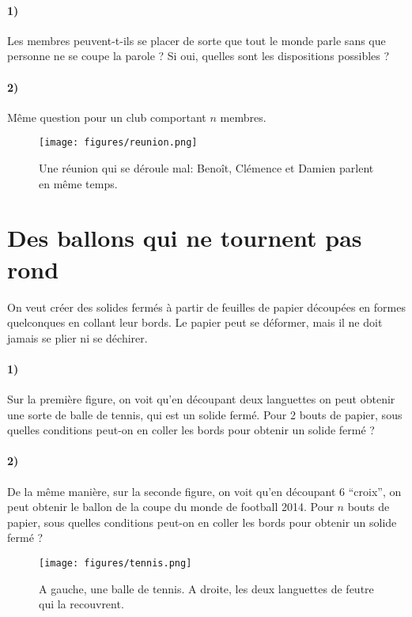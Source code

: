 \documentclass[a4paper,10pt,oneside]{article}
\begin{document}
\paragraph*{1)}
Les membres peuvent-t-ils se placer de sorte que tout le monde parle sans que personne ne se coupe la parole ?
Si oui, quelles sont les dispositions possibles ?

\paragraph*{2)}
Même question pour un club comportant $n$ membres.

\vspace{3cm}
\begin{figure}[!ht]
  \centering
  \texttt{[image: figures/reunion.png]}
  \caption*{Une réunion qui se déroule mal: Benoît, Clémence et Damien parlent en même temps. }
\end{figure}


\clearpage
\section{Des ballons qui ne tournent pas rond}

On veut créer des solides fermés à partir de feuilles de papier découpées en formes quelconques en collant leur bords.
Le papier peut se déformer, mais il ne doit jamais se plier ni se déchirer.

\paragraph*{1)}
Sur la première figure, on voit qu'en découpant deux languettes on peut obtenir une sorte de balle de tennis, qui est un solide fermé.
Pour 2 bouts de papier, sous quelles conditions peut-on en coller les bords pour obtenir un solide fermé ?


\paragraph*{2)}
De la même manière, sur la seconde figure, on voit qu'en découpant 6 ``croix'', on peut obtenir le ballon de la coupe du monde de football 2014.
Pour $n$ bouts de papier, sous quelles conditions peut-on en coller les bords pour obtenir un solide fermé ?


\vspace{3cm}
\begin{figure}[!ht]
  \centering
  \texttt{[image: figures/tennis.png]}
  \caption*{A gauche, une balle de tennis.
  A droite, les deux languettes de feutre qui la recouvrent.}
\end{figure}
\end{document}
